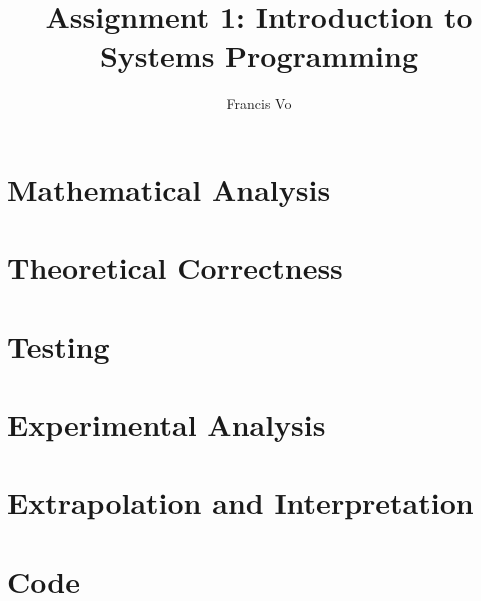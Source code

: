 \documentclass[a4paper,10pt]{article}
\title{Assignment 1: Introduction to Systems Programming}
\author{Francis Vo}
\begin{document}
	\maketitle

	\section{Mathematical Analysis}

	\section{Theoretical Correctness}

	\section{Testing}

	\section{Experimental Analysis}

	\section{Extrapolation and Interpretation}

	\section{Code}
		
		
		
\end{document}
